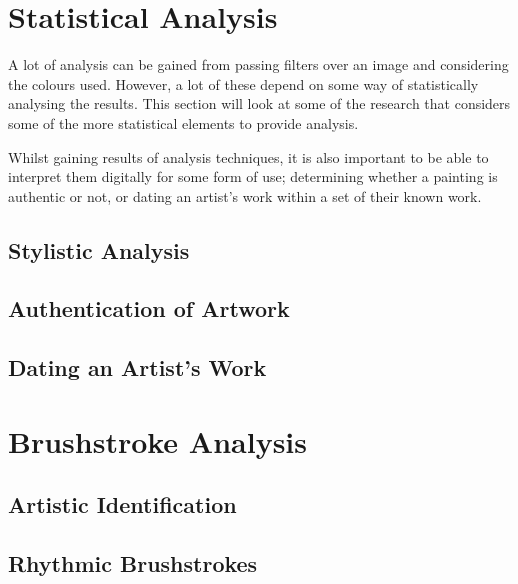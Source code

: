 \documentclass[conference]{IEEEtran}
\begin{document}
\section{Statistical Analysis}

A lot of analysis can be gained from passing filters over an image and
considering the colours used. However, a lot of these depend on some way of
statistically analysing the results. This section will look at some of the
research that considers some of the more statistical elements to provide
analysis.

Whilst gaining results of analysis techniques, it is also important to be able
to interpret them digitally for some form of use; determining whether a
painting is authentic or not, or dating an artist's work within a set of their
known work.

\subsection{Stylistic Analysis}

\subsection{Authentication of Artwork}

\subsection{Dating an Artist's Work}

\section{Brushstroke Analysis}

\subsection{Artistic Identification}

\subsection{Rhythmic Brushstrokes}









\end{document}
